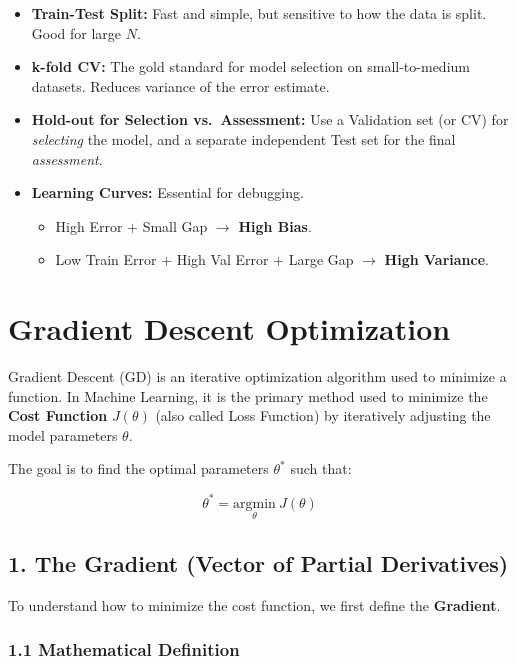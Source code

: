 \documentclass[
  italian,
  11pt,
]{article}
\begin{document}
\begin{itemize}
\item
  \textbf{Train-Test Split:} Fast and simple, but sensitive to how the
  data is split. Good for large \(N\).
\item
  \textbf{k-fold CV:} The gold standard for model selection on
  small-to-medium datasets. Reduces variance of the error estimate.
\item
  \textbf{Hold-out for Selection vs.~Assessment:} Use a Validation set
  (or CV) for \emph{selecting} the model, and a separate independent
  Test set for the final \emph{assessment}.
\item
  \textbf{Learning Curves:} Essential for debugging.

  \begin{itemize}
  \item
    High Error + Small Gap \(\rightarrow\) \textbf{High Bias}.
  \item
    Low Train Error + High Val Error + Large Gap \(\rightarrow\)
    \textbf{High Variance}.
  \end{itemize}

  \newpage
\end{itemize}

\section{Gradient Descent
Optimization}\label{gradient-descent-optimization}

Gradient Descent (GD) is an iterative optimization algorithm used to
minimize a function. In Machine Learning, it is the primary method used
to minimize the \textbf{Cost Function} \(J(\theta)\) (also called Loss
Function) by iteratively adjusting the model parameters \(\theta\).

The goal is to find the optimal parameters \(\theta^*\) such that:

\[\theta^* = \underset{\theta}{\text{argmin}} \ J(\theta)\]

\subsection{1. The Gradient (Vector of Partial
Derivatives)}\label{the-gradient-vector-of-partial-derivatives}

To understand how to minimize the cost function, we first define the
\textbf{Gradient}.

\subsubsection{1.1 Mathematical
Definition}\label{mathematical-definition}
\end{document}
